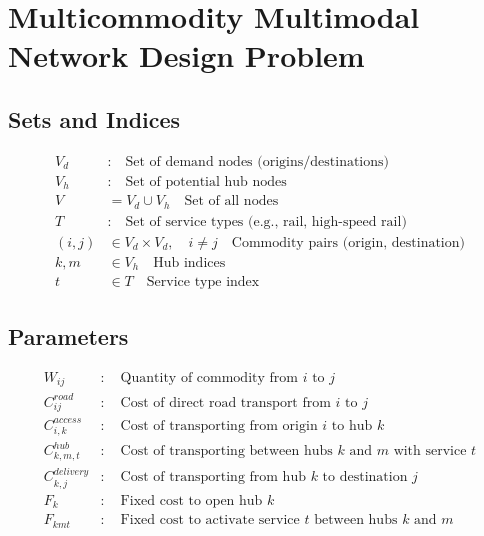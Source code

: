 \documentclass{article}
\begin{document}
\section*{Multicommodity Multimodal Network Design Problem}

\subsection*{Sets and Indices}
\begin{align*}
V_d &:\quad \text{Set of demand nodes (origins/destinations)} \\
V_h &:\quad \text{Set of potential hub nodes} \\
V &= V_d \cup V_h \quad \text{Set of all nodes} \\
T &:\quad \text{Set of service types (e.g., rail, high-speed rail)} \\
(i, j) &\in V_d \times V_d, \quad i \neq j \quad \text{Commodity pairs (origin, destination)} \\
k, m &\in V_h \quad \text{Hub indices} \\
t &\in T \quad \text{Service type index}
\end{align*}

\subsection*{Parameters}
\begin{align*}
W_{ij} &:\quad \text{Quantity of commodity from } i \text{ to } j \\
C^{road}_{ij} &:\quad \text{Cost of direct road transport from } i \text{ to } j \\
C^{access}_{i,k} &:\quad \text{Cost of transporting from origin } i \text{ to hub } k \\
C^{hub}_{k,m,t} &:\quad \text{Cost of transporting between hubs } k \text{ and } m \text{ with service } t \\
C^{delivery}_{k,j} &:\quad \text{Cost of transporting from hub } k \text{ to destination } j \\
F_k &:\quad \text{Fixed cost to open hub } k \\
F_{kmt} &:\quad \text{Fixed cost to activate service } t \text{ between hubs } k \text{ and } m
\end{align*}
\end{document}
